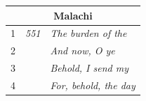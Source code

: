 \documentclass{article}
\newlength{\minipageheight}
\begin{document}
\begin{flushright}
\begin{minipage}[r][\minipageheight][t]{3in}
\begin{longtable}{ccl}
            \multicolumn{3}{c}{\textbf{Malachi}}                                   \\
            \hline
            1           & \textit{551} & \textit{The burden of the}                \\
            2           &              & \textit{And now, O ye}                    \\
            3           &              & \textit{Behold, I send my}                \\
            4           &              & \textit{For, behold, the day}             \\
        \end{longtable}
    \end{minipage}%
\end{flushright}%
\end{document}

